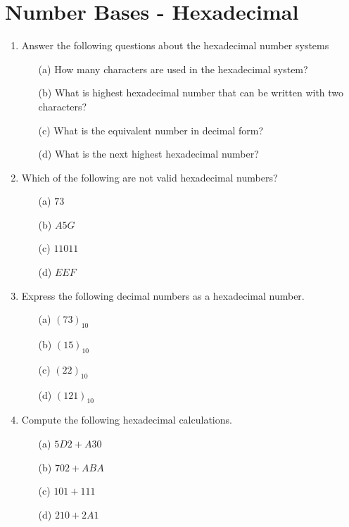 \documentclass[]{report}
\begin{document}
	
\section*{Number Bases - Hexadecimal}
\begin{enumerate}

\item Answer the following questions about the hexadecimal number systems
\begin{itemize}
\item[(a)] How many characters are used in the hexadecimal system?
\item[(b)] What is highest hexadecimal number that can be written with two characters? \item[(c)] What is the equivalent number in decimal form?
\item[(d)] What is the next highest hexadecimal number?
\end{itemize}


\item Which of the following are not valid hexadecimal numbers?
\begin{multicols}{4}
\begin{itemize}
\item[(a)] $73$
\item[(b)] $A5G$
\item[(c)] $11011$
\item[(d)] $EEF$
\end{itemize}
\end{multicols}

\item Express the following decimal numbers as a hexadecimal number.
\begin{multicols}{4}
\begin{itemize}
\item[(a)] $(73)_{10}$
\item[(b)] $(15)_{10}$
\item[(c)] $(22)_{10}$
\item[(d)] $(121)_{10}$
\end{itemize}
\end{multicols}



\item Compute the following hexadecimal calculations.
\begin{multicols}{4}
\begin{itemize}
\item[(a)] $5D2+A30$
\item[(b)] $702+ABA$
\item[(c)] $101+111$
\item[(d)] $210+2A1$
\end{itemize}
\end{multicols}





\end{enumerate}
\end{document}
